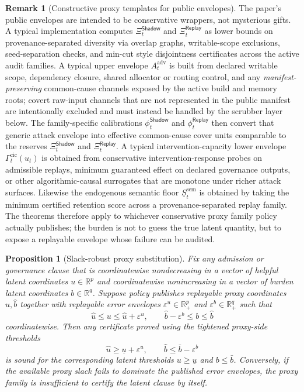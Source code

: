 \documentclass[11pt]{article}
\newtheorem{proposition}[theorem]{Proposition}
\theoremstyle{definition}
\newtheorem{remark}[theorem]{Remark}
\newcommand{\R}{\mathbb{R}}
\newcommand{\1}{\mathbf{1}}
\newcommand{\eps}{\varepsilon}
\newcommand{\Shadow}{\mathsf{Shadow}}
\newcommand{\Replay}{\mathsf{Replay}}
\begin{document}
\begin{remark}[Constructive proxy templates for public envelopes]\label{rem:proxy_templates}
The paper's public envelopes are intended to be conservative wrappers, not mysterious gifts. A typical implementation computes $\Xi_t^{\Shadow}$ and $\Xi_t^{\Replay}$ as lower bounds on provenance-separated diversity via overlap graphs, writable-scope exclusions, seed-separation checks, and min-cut style disjointness certificates across the active audit families. A typical upper envelope $A_t^{\mathrm{adv}}$ is built from declared writable scope, dependency closure, shared allocator or routing control, and any \emph{manifest-preserving} common-cause channels exposed by the active build and memory roots; covert raw-input channels that are not represented in the public manifest are intentionally excluded and must instead be handled by the scrubber layer below. The family-specific calibrations $\phi_t^{\Shadow}$ and $\phi_t^{\Replay}$ then convert that generic attack envelope into effective common-cause cover units comparable to the reserves $\Xi_t^{\Shadow}$ and $\Xi_t^{\Replay}$. A typical intervention-capacity lower envelope $\Gamma_t^{\mathrm{cic}}(u_t)$ is obtained from conservative intervention-response probes on admissible replays, minimum guaranteed effect on declared governance outputs, or other algorithmic-causal surrogates that are monotone under richer attack surfaces. Likewise the endogenous semantic floor $\underline S_t^{\mathrm{sem}}$ is obtained by taking the minimum certified retention score across a provenance-separated replay family. The theorems therefore apply to whichever conservative proxy family policy actually publishes; the burden is not to guess the true latent quantity, but to expose a replayable envelope whose failure can be audited.
\end{remark}

\begin{proposition}[Slack-robust proxy substitution]\label{prop:proxy_gap}
Fix any admission or governance clause that is coordinatewise nondecreasing in a vector of helpful latent coordinates $u\in\R^p$ and coordinatewise nonincreasing in a vector of burden latent coordinates $b\in\R^q$. Suppose policy publishes replayable proxy coordinates $\hat u,\hat b$ together with replayable error envelopes $\eps^u\in\R_+^p$ and $\eps^b\in\R_+^q$ such that
\[
\hat u\le u\le \hat u+\eps^u,
\qquad
\hat b-\eps^b\le b\le \hat b
\]
coordinatewise. Then any certificate proved using the tightened proxy-side thresholds
\[
\hat u\ge \underline u+\eps^u,
\qquad
\hat b\le \bar b-\eps^b
\]
is sound for the corresponding latent thresholds $u\ge \underline u$ and $b\le \bar b$. Conversely, if the available proxy slack fails to dominate the published error envelopes, the proxy family is insufficient to certify the latent clause by itself.
\end{proposition}
\end{document}
